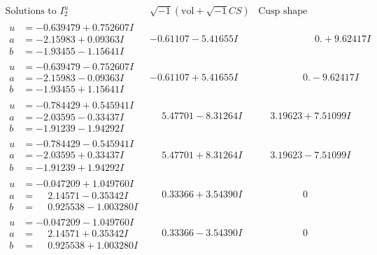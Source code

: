 \documentclass[1p]{elsarticle_modified}
\theoremstyle{definition}
\newcommand{\I}{\sqrt{-1}}
\begin{document}
$$\begin{array}{c|c|c}  
\text{Solutions to }I^u_{2}& \I (\text{vol} + \sqrt{-1}CS) & \text{Cusp shape}\\
 \hline 
\begin{aligned}
u &= -0.639479 + 0.752607 I \\
a &= -2.15983 + 0.09363 I \\
b &= -1.93455 - 1.15641 I\end{aligned}
 & -0.61107 - 5.41655 I & \phantom{-0.000000 -}0. + 9.62417 I \\ \hline\begin{aligned}
u &= -0.639479 - 0.752607 I \\
a &= -2.15983 - 0.09363 I \\
b &= -1.93455 + 1.15641 I\end{aligned}
 & -0.61107 + 5.41655 I & \phantom{-0.000000 } 0. - 9.62417 I \\ \hline\begin{aligned}
u &= -0.784429 + 0.545941 I \\
a &= -2.03595 - 0.33437 I \\
b &= -1.91239 - 1.94292 I\end{aligned}
 & \phantom{-}5.47701 - 8.31264 I & \phantom{-}3.19623 + 7.51099 I \\ \hline\begin{aligned}
u &= -0.784429 - 0.545941 I \\
a &= -2.03595 + 0.33437 I \\
b &= -1.91239 + 1.94292 I\end{aligned}
 & \phantom{-}5.47701 + 8.31264 I & \phantom{-}3.19623 - 7.51099 I \\ \hline\begin{aligned}
u &= -0.047209 + 1.049760 I \\
a &= \phantom{-}2.14571 - 0.35342 I \\
b &= \phantom{-}0.925538 - 1.003280 I\end{aligned}
 & \phantom{-}0.33366 + 3.54390 I & \phantom{-0.000000 } 0 \\ \hline\begin{aligned}
u &= -0.047209 - 1.049760 I \\
a &= \phantom{-}2.14571 + 0.35342 I \\
b &= \phantom{-}0.925538 + 1.003280 I\end{aligned}
 & \phantom{-}0.33366 - 3.54390 I & \phantom{-0.000000 } 0 \\ \hline\begin{aligned}

\end{aligned}
\end{array}$$
\end{document}
